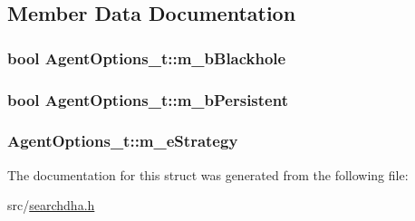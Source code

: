 \subsection{Member Data Documentation}
\hypertarget{structAgentOptions__t_a6be89adf43347bcac511cae0f075e9e9}{
\subsubsection[{m\-\_\-b\-Blackhole}]{\setlength{\rightskip}{0pt plus 5cm}bool Agent\-Options\-\_\-t\-::m\-\_\-b\-Blackhole}}\label{structAgentOptions__t_a6be89adf43347bcac511cae0f075e9e9}
\hypertarget{structAgentOptions__t_a3a115763a6e676c7d7b15614a047e797}{
\subsubsection[{m\-\_\-b\-Persistent}]{\setlength{\rightskip}{0pt plus 5cm}bool Agent\-Options\-\_\-t\-::m\-\_\-b\-Persistent}}\label{structAgentOptions__t_a3a115763a6e676c7d7b15614a047e797}
\hypertarget{structAgentOptions__t_ae5e3591a481f7a2a3772ac41d451fc00}{
\subsubsection[{m\-\_\-e\-Strategy}]{ Agent\-Options\-\_\-t\-::m\-\_\-e\-Strategy}}\label{structAgentOptions__t_ae5e3591a481f7a2a3772ac41d451fc00}


The documentation for this struct was generated from the following file\-:\begin{DoxyCompactItemize}
\item 
src/\hyperlink{searchdha_8h}{searchdha.\-h}\end{DoxyCompactItemize}
